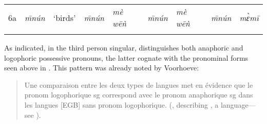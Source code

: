 \documentclass[output=paper]{langsci/langscibook}
\begin{document}
\begin{table}
{\begin{tabular}{lllllllllll}
6a & \textit{\={m}nún} & ‘birds’ & \textit{\={m}nún} &  \textit{mè wēǹ} &   &  \textit{\={m}nún} &  \textit{mè wēǹ} &   &  \textit{\={m}nún} &  \textit{mɛ̀mī}\\
\lspbottomrule
\end{tabular}
}
\end{table}


As indicated, in the third person singular,  distinguishes both anaphoric and logophoric possessive pronouns, the latter cognate with the  pronominal forms seen above in . This  pattern was already noted by Voorhoeve:

\begin{quote}
Une comparaison entre les deux types de langues met en évidence que le pronom logophorique sg correspond avec le pronom anaphorique sg dans les langues [EGB] sans pronom logophorique. (\citealt[192]{Voorhoeve1980logophorique}, describing , a  language—see ).
\end{quote}
\end{document}
